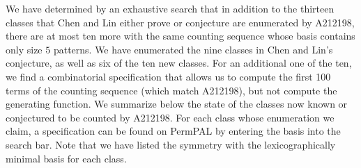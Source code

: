 \documentclass[11pt]{article}
\theoremstyle{definition}
\numberwithin{theorem}{section}
\numberwithin{question}{section}
\numberwithin{definition}{section}
\numberwithin{example}{section}
\numberwithin{remark}{section}
\begin{document}
We have determined by an exhaustive search that in addition to the thirteen classes that Chen and Lin either prove or conjecture are enumerated by A212198, there are at most ten more with the same counting sequence whose basis contains only size $5$ patterns. We have enumerated the nine classes in Chen and Lin's conjecture, as well as six of the ten new classes. For an additional one of the ten, we find a combinatorial specification that allows us to compute the first 100 terms of the counting sequence (which match A212198), but not compute the generating function. We summarize below the state of the classes now known or conjectured to be counted by A212198. For each class whose enumeration we claim, a specification can be found on PermPAL by entering the basis into the search bar. Note that we have listed the symmetry with the lexicographically minimal basis for each class.
\end{document}
